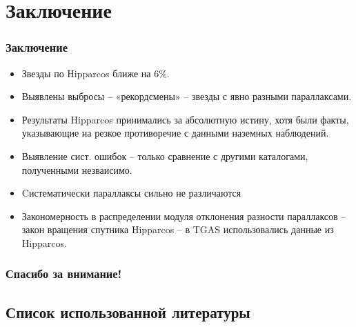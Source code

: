 \documentclass[12pt,aspectratio=43]{beamer}
\begin{document}
\section{Заключение}\label{conclusion}
\begin{frame}
\frametitle{Заключение}

\begin{block}{}
\begin{itemize}
  \item Звезды по Hipparcos ближе на $6\%$.
  \item Выявлены выбросы -- «рекордсмены» -- звезды с явно разными параллаксами.
  \item Результаты Hipparcos принимались за абсолютную истину, хотя были факты, указывающие на резкое противоречие с данными наземных наблюдений.
  \item Выявление сист. ошибок – только сравнение с другими каталогами, полученными незваисимо. 
  \item Cистематически параллаксы сильно не различаются  
  \item Закономерность в распределении модуля отклонения разности параллаксов -- закон вращения спутника Hipparcos -- в TGAS использовались данные из Hipparcos.
  \end{itemize}
\end{block}
\end{frame}	


\appendix
{}
\setcounter{finalframe}{\value{framenumber}}

\begin{frame}
\frametitle{Спасибо за внимание!}
\begin{figure}[h!]
\label{img:alllv}
\end{figure}
\end{frame}

\begin{frame}
\section{Список использованной литературы}\label{conclusionlit}
%
%
\printbibliography[type=online,title={Сайты}]
\printbibliography[type=book,title={Статьи:}]
\end{frame}
\end{document}
